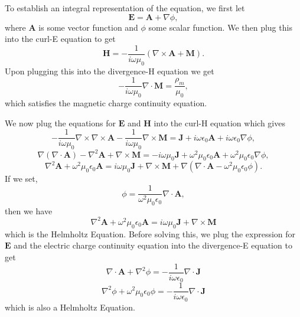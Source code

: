 \documentclass{article}
\newcommand{\Div}[0]{\nabla\cdot}
\newcommand{\Curl}[0]{\nabla\times}
\theoremstyle{plain}
\begin{document}
To establish an integral representation of the equation, we first let
\begin{equation}
	\mathbf{E} = \mathbf{A} + \nabla\phi,
\end{equation}
where $\mathbf{A}$ is some vector function and $\phi$ some scalar function.
We then plug this into the curl-E equation to get
\begin{equation}
	\mathbf{H} = -\frac{1}{i\omega\mu_0}\left( \Curl\mathbf{A} + \mathbf{M} \right).
\end{equation}
Upon plugging this into the divergence-H equation we get
\begin{equation}
	-\frac{1}{i\omega\mu_0}\Div\mathbf{M} = \frac{\rho_m}{\mu_0},
\end{equation}
which satisfies the magnetic charge continuity equation.

We now plug the equations for $\mathbf{E}$ and $\mathbf{H}$ into the curl-H equation which gives
\begin{equation}
	-\frac{1}{i\omega\mu_0}\Curl\Curl\mathbf{A}
	-\frac{1}{i\omega\mu_0}\Curl\mathbf{M}
	=
	\mathbf{J}
	+ i\omega\epsilon_0\mathbf{A}
	+ i\omega\epsilon_0\nabla\phi,
\end{equation}
\begin{equation}
	\nabla(\Div\mathbf{A}) - \nabla^2\mathbf{A}
	+ \Curl\mathbf{M}
	=
	-i\omega\mu_0\mathbf{J}
	+ \omega^2\mu_0\epsilon_0\mathbf{A}
	+ \omega^2\mu_0\epsilon_0\nabla\phi,
\end{equation}
\begin{equation}
	\nabla^2\mathbf{A}
	+ \omega^2\mu_0\epsilon_0\mathbf{A}
	=
	i\omega\mu_0\mathbf{J}
	+ \Curl\mathbf{M}
	+ \nabla(\Div\mathbf{A} - \omega^2\mu_0\epsilon_0\phi).
\end{equation}
If we set,
\begin{equation}
	\phi = \frac{1}{\omega^2\mu_0\epsilon_0}\Div\mathbf{A},
\end{equation}
then we have
\begin{equation}
	\nabla^2\mathbf{A}
	+ \omega^2\mu_0\epsilon_0\mathbf{A}
	=
	i\omega\mu_0\mathbf{J}
	+ \Curl\mathbf{M}
\end{equation}
which is the Helmholtz Equation.
Before solving this, we plug the expression for $\mathbf{E}$ and the electric charge continuity equation
into the divergence-E equation to get
\begin{equation}
	\Div\mathbf{A} + \nabla^2\phi = -\frac{1}{i\omega\epsilon_0}\Div\mathbf{J}
\end{equation}
\begin{equation}
	\nabla^2\phi + \omega^2\mu_0\epsilon_0\phi = -\frac{1}{i\omega\epsilon_0}\Div\mathbf{J}
\end{equation}
which is also a Helmholtz Equation.
\end{document}

